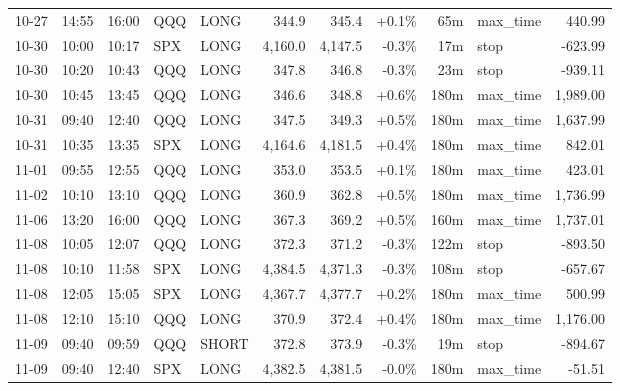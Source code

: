 \documentclass[11pt,a4paper,twoside]{article}
\begin{document}
\begin{center}
\begin{longtable}{>{\color{txtmain}}l l l l l r r r r >{\color{txtmain}}l r}
10-27 & 14:55 & 16:00 & QQQ & LONG & 344.9 & 345.4 & \textcolor{wingreen}{+0.1\%} & 65m & max\_time & \textcolor{wingreen}{440.99} \\
10-30 & 10:00 & 10:17 & SPX & LONG & 4,160.0 & 4,147.5 & \textcolor{lossred}{-0.3\%} & 17m & stop & \textcolor{lossred}{-623.99} \\
10-30 & 10:20 & 10:43 & QQQ & LONG & 347.8 & 346.8 & \textcolor{lossred}{-0.3\%} & 23m & stop & \textcolor{lossred}{-939.11} \\
10-30 & 10:45 & 13:45 & QQQ & LONG & 346.6 & 348.8 & \textcolor{wingreen}{+0.6\%} & 180m & max\_time & \textcolor{wingreen}{1,989.00} \\
10-31 & 09:40 & 12:40 & QQQ & LONG & 347.5 & 349.3 & \textcolor{wingreen}{+0.5\%} & 180m & max\_time & \textcolor{wingreen}{1,637.99} \\
10-31 & 10:35 & 13:35 & SPX & LONG & 4,164.6 & 4,181.5 & \textcolor{wingreen}{+0.4\%} & 180m & max\_time & \textcolor{wingreen}{842.01} \\
11-01 & 09:55 & 12:55 & QQQ & LONG & 353.0 & 353.5 & \textcolor{wingreen}{+0.1\%} & 180m & max\_time & \textcolor{wingreen}{423.01} \\
11-02 & 10:10 & 13:10 & QQQ & LONG & 360.9 & 362.8 & \textcolor{wingreen}{+0.5\%} & 180m & max\_time & \textcolor{wingreen}{1,736.99} \\
11-06 & 13:20 & 16:00 & QQQ & LONG & 367.3 & 369.2 & \textcolor{wingreen}{+0.5\%} & 160m & max\_time & \textcolor{wingreen}{1,737.01} \\
11-08 & 10:05 & 12:07 & QQQ & LONG & 372.3 & 371.2 & \textcolor{lossred}{-0.3\%} & 122m & stop & \textcolor{lossred}{-893.50} \\
11-08 & 10:10 & 11:58 & SPX & LONG & 4,384.5 & 4,371.3 & \textcolor{lossred}{-0.3\%} & 108m & stop & \textcolor{lossred}{-657.67} \\
11-08 & 12:05 & 15:05 & SPX & LONG & 4,367.7 & 4,377.7 & \textcolor{wingreen}{+0.2\%} & 180m & max\_time & \textcolor{wingreen}{500.99} \\
11-08 & 12:10 & 15:10 & QQQ & LONG & 370.9 & 372.4 & \textcolor{wingreen}{+0.4\%} & 180m & max\_time & \textcolor{wingreen}{1,176.00} \\
11-09 & 09:40 & 09:59 & QQQ & SHORT & 372.8 & 373.9 & \textcolor{lossred}{-0.3\%} & 19m & stop & \textcolor{lossred}{-894.67} \\
11-09 & 09:40 & 12:40 & SPX & LONG & 4,382.5 & 4,381.5 & \textcolor{lossred}{-0.0\%} & 180m & max\_time & \textcolor{lossred}{-51.51} \\

\end{longtable}
\end{center}
\end{document}
